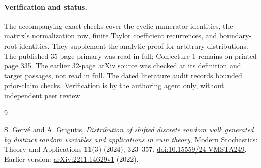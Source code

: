 \documentclass[11pt]{article}
\begin{document}
\paragraph{Verification and status.}
The accompanying exact checks cover the cyclic numerator identities,
the matrix's normalization row, finite Taylor coefficient recurrences,
and boundary-root identities. They supplement the analytic proof
for arbitrary distributions. The published 35-page primary was read
in full; Conjecture 1 remains on printed page 335. The earlier
32-page arXiv source was checked at its definition and target
passages, not read in full. The dated literature audit records
bounded prior-claim checks. Verification is by the authoring agent
only, without independent peer review.

\begin{thebibliography}{9}
\raggedright
{} S. Gerv\'e and A. Grigutis,
\emph{Distribution of shifted discrete random walk generated by
distinct random variables and applications in ruin theory},
Modern Stochastics: Theory and Applications \textbf{11}(3) (2024),
323--357.
\href{https://doi.org/10.15559/24-VMSTA249}{doi:10.15559/24-VMSTA249}.
Earlier version:
\href{https://arxiv.org/abs/2211.14629}{arXiv:2211.14629v1} (2022).
\end{thebibliography}
\end{document}
